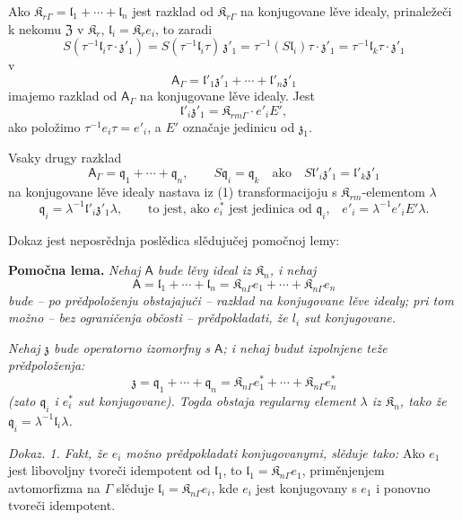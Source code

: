 \documentclass[11pt]{article}
\begin{document}
Ako \(\mathfrak K_{r\Gamma}=\mathfrak l_1+\cdots+\mathfrak l_n\) jest razklad od \(\mathfrak K_{r\Gamma}\) na konjugovane lěve idealy, prinaležeči k nekomu \(\mathfrak Z\) v \(\mathfrak K_r\), \(\mathfrak l_i=\mathfrak K_re_i\), to zaradi
\[
S(\tau^{-1}\mathfrak l_i\tau\cdot\mathfrak z'_1)
=S(\tau^{-1}\mathfrak l_i\tau)\,\mathfrak z'_1
=\tau^{-1}(S\mathfrak l_i)\tau\cdot\mathfrak z'_1
=\tau^{-1}\mathfrak l_k\tau\cdot\mathfrak z'_1
\]
v
\[
\tag{1}
\mathsf{A}_\Gamma=\mathfrak l'_1\mathfrak z'_1+\cdots+\mathfrak l'_n\mathfrak z'_1
\]
imajemo razklad od \(\mathsf{A}_\Gamma\) na konjugovane lěve idealy. Jest
\[
\mathfrak l'_i\mathfrak z'_1=\mathfrak K_{rm\Gamma}\cdot e'_iE',
\]
ako položimo \(\tau^{-1}e_i\tau=e'_i\), a \(E'\) označaje jedinicu od \(\mathfrak z_1\).

Vsaky drugy razklad
\[
\tag{2}
\mathsf{A}_\Gamma=\mathfrak q_1+\cdots+\mathfrak q_n,\qquad
S\mathfrak q_i=\mathfrak q_k\quad\text{ako}\quad
S\mathfrak l'_i\mathfrak z'_1=\mathfrak l'_k\mathfrak z'_1
\]
na konjugovane lěve idealy nastava iz (1) transformacijoju s \(\mathfrak K_{rm}\)-elementom \(\lambda\)
\[
\mathfrak q_i=\lambda^{-1}\mathfrak l'_i\mathfrak z'_1\lambda,
\qquad
\text{to jest, ako \(e_i^*\) jest jedinica od \(\mathfrak q_i\),}\quad
e'_i=\lambda^{-1}e'_iE'\lambda.
\]

Dokaz jest neposrědnja poslědica slědujučej pomočnoj lemy:

\textbf{Pomočna lema.} \emph{Nehaj \(\mathsf{A}\) bude lěvy ideal iz \(\mathfrak K_n\), i nehaj}
\[
\mathsf{A}=\mathfrak l_1+\cdots+\mathfrak l_n
=\mathfrak K_{n\Gamma}e_1+\cdots+\mathfrak K_{n\Gamma}e_n
\]
\emph{bude -- po prědpoloženju obstajajuči -- razklad na konjugovane lěve idealy; pri tom možno -- bez ograničenja občosti -- prědpokladati, že \(l_i\) sut konjugovane.}

\emph{Nehaj \(\mathfrak z\) bude operatorno izomorfny s \(\mathsf{A}\); i nehaj budut izpolnjene teže prědpoloženja:}
\[
\mathfrak z=\mathfrak q_1+\cdots+\mathfrak q_n
=\mathfrak K_{n\Gamma}e_1^*+\cdots+\mathfrak K_{n\Gamma}e_n^*
\]
\emph{(zato \(\mathfrak q_i\) i \(e_i^*\) sut konjugovane). Togda obstaja regularny element \(\lambda\) iz \(\mathfrak K_n\), tako že \(\mathfrak q_i=\lambda^{-1}\mathfrak l_i\lambda\).}

\emph{Dokaz. 1. Fakt, že \(e_i\) možno prědpokladati konjugovanymi, slěduje tako:} Ako \(e_1\) jest libovoljny tvoreči idempotent od \(\mathfrak l_1\), to \(\mathfrak l_1=\mathfrak K_{n\Gamma}e_1\), priměnjenjem avtomorfizma na \(\Gamma\) slěduje \(\mathfrak l_i=\mathfrak K_{n\Gamma}e_i\), kde \(e_i\) jest konjugovany s \(e_1\) i ponovno tvoreči idempotent.
\end{document}
